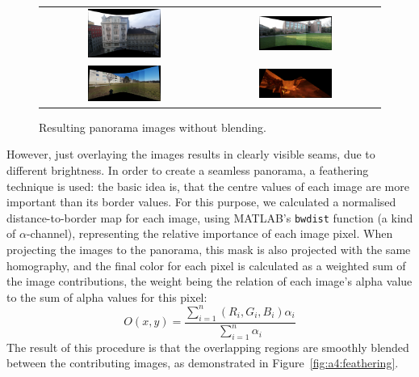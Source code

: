 \begin{figure}[h]
	\centering
	\begin{tabular}{cc}
	\includegraphics[width=0.45\textwidth]{figures/office_p_b.png} &
	\includegraphics[width=0.45\textwidth]{figures/campus_p_b.png} \\
	\includegraphics[width=0.45\textwidth]{figures/own_p_b.png} &
	\includegraphics[width=0.45\textwidth]{figures/doom_p_b.png}

	\end{tabular}
	\caption{Resulting panorama images without blending.}
	\label{fig:a4:noblend}
\end{figure}

However, just overlaying the images results in clearly visible seams, due to different brightness. In order to create a seamless panorama, a feathering technique is used: the basic idea is, that the centre values of each image are more important than its border values. For this purpose, we calculated a normalised distance-to-border map for each image, using MATLAB's \texttt{bwdist} function (a kind of $\alpha$-channel), representing the relative importance of each image pixel. When projecting the images to the panorama, this mask is also projected with the same homography, and the final color for each pixel is calculated as a weighted sum of the image contributions, the weight being the relation of each image's alpha value to the sum of alpha values for this pixel:
$$ O(x,y)=\frac{\sum_{i=1}^{n}{(R_i,G_i,B_i) \alpha_i}}{\sum_{i=1}^{n}{\alpha_i}} $$
The result of this procedure is that the overlapping regions are smoothly blended between the contributing images, as demonstrated in Figure~\ref{fig:a4:feathering}.

